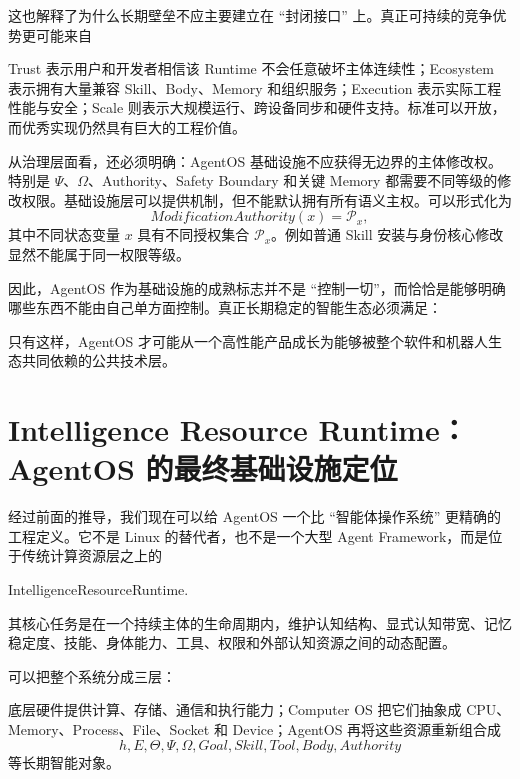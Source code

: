 这也解释了为什么长期壁垒不应主要建立在 ``封闭接口'' 上。真正可持续的竞争优势更可能来自
\begin{statementbox}
\centering
{}
\end{statementbox}
Trust 表示用户和开发者相信该 Runtime 不会任意破坏主体连续性；Ecosystem 表示拥有大量兼容 Skill、Body、Memory 和组织服务；Execution 表示实际工程性能与安全；Scale 则表示大规模运行、跨设备同步和硬件支持。标准可以开放，而优秀实现仍然具有巨大的工程价值。

从治理层面看，还必须明确：AgentOS 基础设施不应获得无边界的主体修改权。特别是 $\Psi$、$\Omega$、Authority、Safety Boundary 和关键 Memory 都需要不同等级的修改权限。基础设施层可以提供机制，但不能默认拥有所有语义主权。可以形式化为
\[
ModificationAuthority(x)
=
\mathcal P_x,
\]
其中不同状态变量 $x$ 具有不同授权集合 $\mathcal P_x$。例如普通 Skill 安装与身份核心修改显然不能属于同一权限等级。

因此，AgentOS 作为基础设施的成熟标志并不是 ``控制一切''，而恰恰是能够明确哪些东西不能由自己单方面控制。真正长期稳定的智能生态必须满足：
\begin{statementbox}
\centering
{}
\end{statementbox}
只有这样，AgentOS 才可能从一个高性能产品成长为能够被整个软件和机器人生态共同依赖的公共技术层。

\section{Intelligence Resource Runtime：AgentOS 的最终基础设施定位}

经过前面的推导，我们现在可以给 AgentOS 一个比 ``智能体操作系统'' 更精确的工程定义。它不是 Linux 的替代者，也不是一个大型 Agent Framework，而是位于传统计算资源层之上的
\begin{statementbox}
IntelligenceResourceRuntime.
\end{statementbox}
其核心任务是在一个持续主体的生命周期内，维护认知结构、显式认知带宽、记忆稳定度、技能、身体能力、工具、权限和外部认知资源之间的动态配置。

可以把整个系统分成三层：
\begin{statementbox}
\centering
{}
\end{statementbox}
底层硬件提供计算、存储、通信和执行能力；Computer OS 把它们抽象成 CPU、Memory、Process、File、Socket 和 Device；AgentOS 再将这些资源重新组合成
\[
h,E,\Theta,\Psi,\Omega,
Goal,Skill,Tool,Body,Authority
\]
等长期智能对象。

